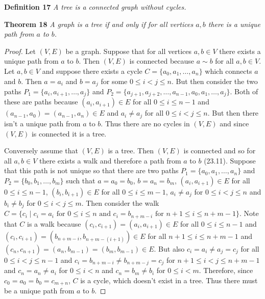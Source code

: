 \documentclass{article}
\begin{document}
\begin{flushleft}
\textbf{Definition 17}
\textsl{A tree is a connected graph without cycles.}\newline

\textbf{Theorem 18}
\textsl{A graph is a tree if and only if for all vertices $a,b$ there is a unique path from $a$ to $b$.}
\begin{proof}
Let $(V,E)$ be a graph. Suppose that for all vertices $a,b \in V$ there exists a unique path from $a$ to $b$. Then $(V,E)$ is connected because $a \sim b$ for all $a,b \in V$. Let $a,b \in V$ and suppose there exists a cycle $C = \{a_0, a_1, \dots , a_n\}$ which connects $a$ and $b$. Then $a = a_i$ and $b=a_j$ for some $0 \leq i < j \leq n$. But then consider the two paths $P_1 = \{a_i, a_{i+1}, \dots , a_j\}$ and $P_2 = \{a_{j+1}, a_{j+2}, \dots , a_{n-1}, a_0, a_1, \dots , a_j\}$. Both of these are paths because $(a_i, a_{i+1}) \in E$ for all $0 \leq i \leq n-1$ and $(a_{n-1},a_0) = (a_{n-1},a_n) \in E$ and $a_i \neq a_j$ for all $0 \leq i < j \leq n$. But then there isn't a unique path from $a$ to $b$. Thus there are no cycles in $(V,E)$ and since $(V,E)$ is connected it is a tree.\newline

Conversely assume that $(V,E)$ is a tree. Then $(V,E)$ is connected and so for all $a,b \in V$ there exists a walk and therefore a path from $a$ to $b$ (23.11). Suppose that this path is not unique so that there are two paths $P_1 = \{a_0, a_1, \dots , a_n\}$ and $P_2 = \{b_0, b_1, \dots , b_m\}$ such that $a = a_0 = b_0$, $b = a_n = b_m$, $(a_i, a_{i+1}) \in E$ for all $0 \leq i \leq n-1$, $(b_i, b_{i+1}) \in E$ for all $0 \leq i \leq m-1$, $a_i \neq a_j$ for $0 \leq i < j \leq n$ and $b_i \neq b_j$ for $0 \leq i < j \leq m$. Then consider the walk $C = \{c_i \mid \text{$c_i = a_i$ for $0 \leq i \leq n$ and $c_i = b_{n+m-i}$ for $n+1 \leq i \leq n+m-1$}\}$. Note that $C$ is a walk because $(c_i, c_{i+1}) = (a_i, a_{i+1}) \in E$ for all $0 \leq i \leq n-1$ and $(c_i, c_{i+1}) = (b_{n+m-i}, b_{n+m-(i+1)}) \in E$ for all $n+1 \leq i \leq n+m-1$ and $(c_n, c_{n+1}) = (a_n, b_{m-1}) = (b_m, b_{m-1}) \in E$. But also $c_i = a_i \neq a_j = c_j$ for all $0 \leq i < j \leq n-1$ and $c_i = b_{n+m-i} \neq b_{n+m-j} = c_j$ for $n+1 \leq i < j \leq n+m-1$ and $c_n = a_n \neq a_i$ for $0 \leq i < n$ and $c_n = b_m \neq b_i$ for $0 \leq i < m$. Therefore, since $c_0 = a_0 = b_0 = c_{m+n}$, $C$ is a cycle, which doesn't exist in a tree. Thus there must be a unique path from $a$ to $b$.
\end{proof}


\end{flushleft}
\end{document}

